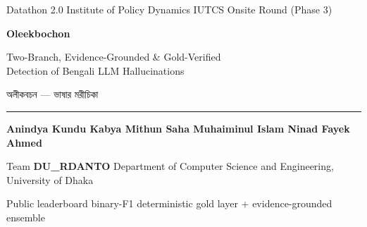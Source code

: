\documentclass[aspectratio=169,11pt,t]{beamer}
\newcommand{\metric}[1]{{\color{primary}\bfseries #1}}
\begin{document}
{%
\begin{frame}[plain]
  \vspace{0.15cm}
  {\color{white}\hspace{0.7cm}\footnotesize Datathon 2.0 \; \textbullet\; Institute of Policy Dynamics \; \textbullet\; IUTCS \hfill Onsite Round (Phase 3)\hspace{0.7cm}}
  \vspace{1.15cm}

  \begin{center}
    {\LARGE\bfseries\color{primary} Oleekbochon\par}
    \vspace{0.25em}
    {\large\color{ink} Two-Branch, Evidence-Grounded \& Gold-Verified\\ Detection of Bengali LLM Hallucinations\par}
    \vspace{0.35em}
    {\bnfont\large\color{soft} অলীকবচন — ভাষার মরীচিকা\par}
    \vspace{0.95em}
    {\color{accent}\rule{6cm}{1.5pt}}\par
    \vspace{0.8em}
    {\large\bfseries Anindya Kundu \quad Kabya Mithun Saha \quad Muhaiminul Islam Ninad \quad Fayek Ahmed\par}
    \vspace{0.45em}
    {\color{soft} Team \textbf{DU\_RDANTO} \;\textbullet\; Department of Computer Science and Engineering, University of Dhaka\par}
    \vspace{0.8em}
    {\footnotesize Public leaderboard binary-F1 \;\metric{0.904}\; \textbullet\; deterministic gold layer + evidence-grounded ensemble\par}
  \end{center}
\end{frame}
}
\end{document}
